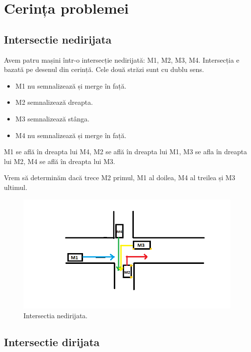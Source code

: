  \section{Cerința problemei}
\subsection{Intersectie nedirijata}
Avem patru mașini într-o intersecție nedirijată: M1, M2, M3, M4.
\newline
Intersecția e bazată pe desenul din cerință.
\newline
Cele două străzi sunt cu dublu sens.
\newline
 \begin{itemize}
    \setlength\itemsep{0em}
    \item M1 nu semnalizează și merge în față.
    \item M2 semnalizează dreapta.
    \item M3 semnalizează stânga.
    \item M4 nu semnalizează și merge în față.

\end{itemize}


M1 se află în dreapta lui M4, M2 se află în dreapta lui M1, M3 se afla în dreapta lui M2, M4 se află în dreapta lui M3.

Vrem să determinăm dacă trece M2 primul, M1 al doilea, M4 al treilea și M3 ultimul.


\begin{figure}[htb]
  \includegraphics[width=\linewidth]{car.png}
 \caption{Intersectia nedirijata.}
  \label{fig:boat1}
  \end{figure}


\newpage

\subsection{Intersectie dirijata}

